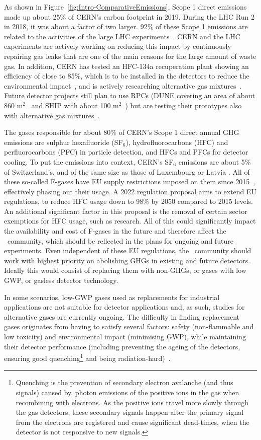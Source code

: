 \documentclass[../SustainableHEP.tex]{subfiles}
\begin{document}
As shown in Figure~\ref{fig:Intro-ComparativeEmissions}, Scope 1 direct emissions made up about 25\% of CERN's carbon footprint in 2019. During the LHC Run 2 in 2018, it was about a factor of two larger.  92\% of these Scope 1 emissions are related to the activities of the large LHC experiments~\cite{Environment:2737239,envrep2020}. CERN and the LHC experiments are actively working on reducing this impact by continuously repairing gas leaks that are one of the main reasons for the large amount of waste gas. In addition, CERN has tested an HFC-134a recuperation plant showing an efficiency of close to 85\%, which is to be installed in the detectors to reduce the environmental impact~\cite{envrep2020}, and is actively researching alternative gas mixtures~\cite{Mandelli:2022qjc}. Future detector projects still plan to use RPCs (DUNE covering an area of about 860 m$^2$~\cite{DUNE:2016rla} and SHIP with about 100 m$^2$~\cite{SHiP:2021nfo}) but are testing their prototypes also with alternative gas mixtures~\cite{Albanese_2023}.  

The gases responsible for about 80\% of CERN's Scope 1 direct annual GHG emissions are sulphur hexafluoride (SF$_6$), hydrofluorocarbons (HFC) and perfluorocarbons (PFC) in particle detection, and HFCs and PFCs for detector cooling. To put the emissions into context, CERN's SF$_6$ emissions are about 5\% of Switzerland's, and of the same size as those of Luxembourg or Latvia \cite{SF6data}. All of these so-called F-gases have EU supply restrictions imposed on them since 2015~\cite{EUFgasregulation}, effectively phasing out their usage. A 2022 regulation proposal aims to extend EU regulations, \eg to reduce HFC usage down to 98\% by 2050 compared to 2015 levels. An additional significant factor in this proposal is the removal of certain sector exemptions for HFC usage, such as research. All of this could significantly impact the availability and cost of F-gases in the future and therefore affect the \ACR\ community, which should be reflected in the plans for ongoing and future experiments. Even independent of these EU regulations, the \ACR\ community should work with highest priority on abolishing GHGs in existing and future detectors. Ideally this would consist of replacing them with non-GHGs, or gases with low GWP,  or gasless detector technology.

In some scenarios, low-GWP gases used as replacements for industrial applications are not suitable for detector applications and, as such, studies for alternative gases are currently ongoing. The difficulty in finding replacement gases originates from having to satisfy several factors: safety (non-flammable and low toxicity) and environmental impact (minimising GWP), while maintaining their detector performance (including preventing the ageing of the detectors, ensuring good quenching\footnote{Quenching is the prevention of secondary electron avalanche (and thus signals) caused by, \eg photon emissions of the positive ions in the gas when recombining with electrons. As the positive ions travel more slowly through the gas detectors, these secondary signals happen after the primary signal from the electrons are registered and cause significant dead-times, when the detector is not responsive to new signals.} and being radiation-hard)~\cite{Bloom:2022gux}.
\end{document}
